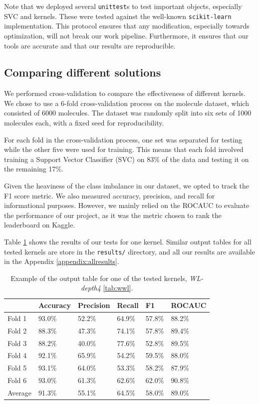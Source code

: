 \documentclass{IEEEtran}
\begin{document}
Note that we deployed several \texttt{unittest}s to test important objects, especially SVC and kernels. These were tested against the well-known \texttt{scikit-learn} implementation. This protocol ensures that any modification, especially towards optimization, will not break our work pipeline. Furthermore, it ensures that our tools are accurate and that our results are reproducible.

\subsection{Comparing different solutions}
We performed cross-validation to compare the effectiveness of different kernels. We chose to use a 6-fold cross-validation process on the molecule dataset, which consisted of 6000 molecules. The dataset was randomly split into six sets of 1000 molecules each, with a fixed seed for reproducibility.

For each fold in the cross-validation process, one set was separated for testing while the other five were used for training. This means that each fold involved training a Support Vector Classifier (SVC) on 83\% of the data and testing it on the remaining 17\%.

Given the heaviness of the class imbalance in our dataset,
we opted to track the F1 score metric. We also measured accuracy, precision, and recall for informational purposes.
However, we mainly relied on the ROCAUC to evaluate the performance of our project, as it was the metric chosen to rank the leaderboard on Kaggle.

Table \ref{tab:example} shows the results of our tests for one kernel.
Similar output tables for all tested kernels are store in the \texttt{results/} directory,
and all our results are available in the Appendix \ref{appendix:allresults}.

\begin{table}[h]
    \centering
    \begin{tabular}{l||llll|l}
                & Accuracy & Precision & Recall & F1     & ROCAUC \\
        \hline \hline
        Fold 1  & 93.0\%   & 52.2\%    & 64.9\% & 57.8\% & 88.2\% \\
        Fold 2  & 88.3\%   & 47.3\%    & 74.1\% & 57.8\% & 89.4\% \\
        Fold 3  & 88.2\%   & 40.0\%    & 77.6\% & 52.8\% & 89.5\% \\
        Fold 4  & 92.1\%   & 65.9\%    & 54.2\% & 59.5\% & 88.0\% \\
        Fold 5  & 93.1\%   & 64.0\%    & 53.3\% & 58.2\% & 87.9\% \\
        Fold 6  & 93.0\%   & 61.3\%    & 62.6\% & 62.0\% & 90.8\% \\
        \hline
        Average & 91.3\%   & 55.1\%    & 64.5\% & 58.0\% & 89.0\% \\
    \end{tabular}
    \caption{Example of the output table for one of the tested kernels, \emph{WL-depth4} \ref{tab:wwl}.}
    \label{tab:example}
\end{table}
\end{document}
